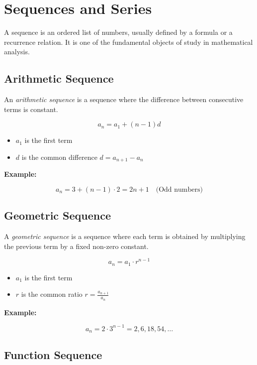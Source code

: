 \newpage
\section{Sequences and Series}

A sequence is an ordered list of numbers, usually defined by a formula or a recurrence relation. It is one of the fundamental objects of study in mathematical analysis.

\subsection{Arithmetic Sequence}

An \emph{arithmetic sequence} is a sequence where the difference between consecutive terms is constant.

\[
a_n = a_1 + (n - 1)d
\]

\begin{itemize}[label=\(-\)]
\item \(a_1\) is the first term
\item \(d\) is the common difference \(d = a_{n + 1} - a_{n}\)
\end{itemize}

\textbf{Example:}
\vspace{\baselineskip}

\[
a_n = 3 + (n - 1) \cdot 2 = 2n + 1 \quad \text{(Odd numbers)}
\]

\subsection{Geometric Sequence}

A \emph{geometric sequence} is a sequence where each term is obtained by multiplying the previous term by a fixed non-zero constant.

\[
a_n = a_1 \cdot r^{n-1}
\]

\begin{itemize}[label=\(-\)]
\item \(a_1\) is the first term
\item \(r\) is the common ratio \(r = \frac{a_{n + 1}}{a_n}\)
\end{itemize}

\textbf{Example:}
\vspace{\baselineskip}

\[
a_n = 2 \cdot 3^{n-1} = 2, 6, 18, 54, \dots
\]

\subsection{Function Sequence}

